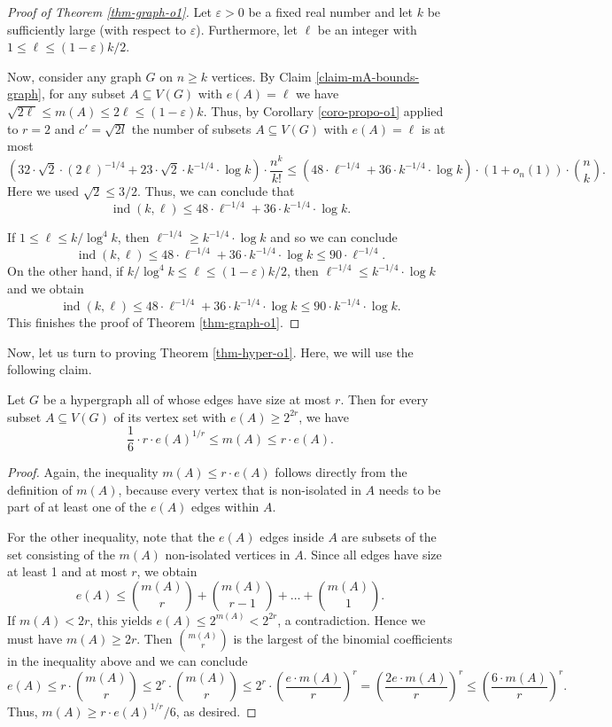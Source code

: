 \begin{proof}[Proof of Theorem  \ref{thm-graph-o1}]Let $\varepsilon>0$ be a fixed real number and let $k$ be sufficiently large (with respect to $\varepsilon$). Furthermore, let $\ell$ be an integer with $1 \leq \ell\leq (1-\varepsilon)k/2$.

Now, consider any graph $G$ on $n\geq k$ vertices. By Claim \ref{claim-mA-bounds-graph}, for any subset $A\subseteq V(G)$ with $e(A)=\ell$ we have $\sqrt{2\ell}\leq m(A)\leq 2\ell\leq  (1-\varepsilon)k$. Thus, by Corollary \ref{coro-propo-o1} applied to $r=2$ and $c'=\sqrt{2l}$ the number of subsets $A\subseteq V(G)$ with $e(A)=\ell$ is at most
\[\left(32\cdot \sqrt{2}\cdot (2\ell)^{-1/4}+23 \cdot \sqrt{2}\cdot k^{-1/4}\cdot \log k\right)\cdot \frac{n^k}{k!}\leq \left(48\cdot \ell^{-1/4}+36 \cdot k^{-1/4}\cdot \log k\right)\cdot (1+o_n(1))\cdot {n\choose k}.\]
Here we used $\sqrt{2}\leq 3/2$. Thus, we can conclude that
\[\operatorname{ind}(k,\ell)\leq 48\cdot \ell^{-1/4}+36 \cdot k^{-1/4}\cdot \log k.\]

If $1\leq \ell\leq k/\log^4 k$, then $\ell^{-1/4}\geq k^{-1/4}\cdot \log k$ and so we can conclude
\[\operatorname{ind}(k,\ell)\leq 48\cdot \ell^{-1/4}+36 \cdot k^{-1/4}\cdot \log k\leq 90\cdot \ell^{-1/4}.\]
On the other hand, if $k/\log^4 k \leq \ell\leq (1-\varepsilon)k/2$, then $\ell^{-1/4}\leq k^{-1/4}\cdot \log k$ and we obtain
\[\operatorname{ind}(k,\ell)\leq 48\cdot \ell^{-1/4}+36 \cdot k^{-1/4}\cdot \log k\leq 90\cdot k^{-1/4}\cdot \log k.\] 
This finishes the proof of Theorem \ref{thm-graph-o1}.
\end{proof}

Now, let us turn to proving Theorem \ref{thm-hyper-o1}. Here, we will use the following claim.

\begin{claim}\label{claim-mA-bounds-hyper} Let $G$ be a hypergraph all of whose edges have size at most $r$. Then for every subset $A\subseteq V(G)$ of its vertex set with $e(A)\geq 2^{2r}$, we have
\[\frac{1}{6}\cdot r\cdot e(A)^{1/r}\leq m(A)\leq r\cdot e(A).\]
\end{claim}
\begin{proof}Again, the inequality $m(A)\leq r\cdot e(A)$ follows directly from the definition of $m(A)$, because every vertex that is non-isolated in $A$ needs to be part of at least one of the $e(A)$ edges within $A$.

For the other inequality, note that the $e(A)$ edges inside $A$ are subsets of the set consisting of the $m(A)$ non-isolated vertices in $A$. Since all edges have size at least 1 and at most $r$, we obtain
\[e(A)\leq {m(A)\choose r}+{m(A)\choose r-1}+\dots+{m(A)\choose 1}.\]
If $m(A)<2r$, this yields $e(A)\leq 2^{m(A)}<2^{2r}$, a contradiction. Hence we must have $m(A)\geq 2r$. Then ${m(A)\choose r}$ is the largest of the binomial coefficients in the inequality above and we can conclude
\[e(A)\leq r\cdot {m(A)\choose r}\leq 2^r\cdot {m(A)\choose r}\leq 2^r\cdot\left(\frac{e\cdot m(A)}{r}\right)^{r}=\left(\frac{2e\cdot m(A)}{r}\right)^{r}\leq \left(\frac{6\cdot m(A)}{r}\right)^{r}.\]
Thus, $m(A)\geq  r\cdot e(A)^{1/r}/6$, as desired.
\end{proof}

